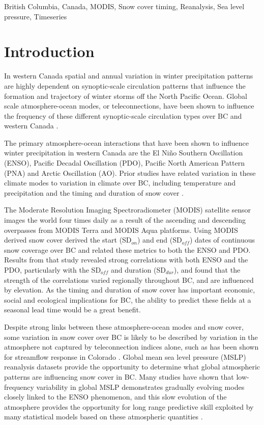 \documentclass{tATO2e}
\newcommand{\sdoff}{SD$_{off}$}
\newcommand{\sdon}{SD$_{on}$}
\newcommand{\sddur}{SD$_{dur}$}
\begin{document}
\begin{keywords}
British Columbia, Canada, MODIS, Snow cover timing, Reanalysis, Sea level pressure, Timeseries
\end{keywords}

\newpage

\section{Introduction}
In western Canada spatial and annual variation in winter precipitation patterns are highly dependent on synoptic-scale circulation patterns that influence the formation and trajectory of winter storms off the North Pacific Ocean. Global scale atmosphere-ocean modes, or teleconnections, have been shown to influence the frequency of these different synoptic-scale circulation types over BC and western Canada \citep{Stahl2006-og}.
\par
The primary atmosphere-ocean interactions that have been shown to influence winter precipitation in western Canada are the El Niño Southern Oscillation (ENSO), Pacific Decadal Oscillation (PDO), Pacific North American Pattern (PNA) and Arctic Oscillation (AO). Prior studies have related variation in these climate modes to variation in climate over BC, including temperature and precipitation \citep[e.g.,][]{Shabbar1996-oc, Mantua1997-ri} and the timing and duration of snow cover \citep[e.g.,][]{Moore1996-xr,Bevington2019}. 
\par
The Moderate Resolution Imaging Spectroradiometer (MODIS) satellite sensor images the world four times daily as a result of the ascending and descending overpasses from MODIS Terra and MODIS Aqua platforms. Using MODIS derived snow cover \cite{Bevington2019} derived the start (\sdon{}) and end (\sdoff{}) dates of continuous snow coverage over BC and related these metrics to both the ENSO and PDO. Results from that study revealed strong correlations with both ENSO and the PDO, particularly with the \sdoff{} and duration (\sddur{}), and found that the strength of the correlations varied regionally throughout BC, and are influenced by elevation. As the timing and duration of snow cover has important economic, social and ecological implications for BC, the ability to predict these fields at a seasonal lead time would be a great benefit.
\par
Despite strong links between these atmosphere-ocean modes and snow cover, some variation in snow cover over BC is likely to be described by variation in the atmosphere not captured by teleconnection indices alone, such as has been shown for streamflow response in Colorado \citep{Regonda2006}. Global mean sea level pressure (MSLP) reanalysis datasets provide the opportunity to determine what global atmospheric patterns are influencing snow cover in BC. Many studies have shown that low-frequency variability in global MSLP demonstrates gradually evolving modes closely linked to the ENSO phenomenon, and this slow evolution of the atmosphere provides the opportunity for long range predictive skill exploited by many statistical models based on these atmospheric quantities \citep{Latif1998}. 
\end{document}
